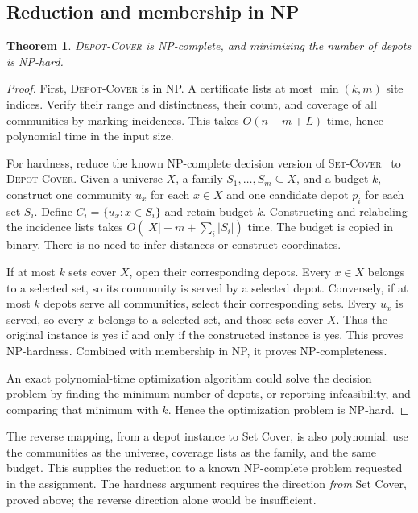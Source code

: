 \documentclass[sigconf,nonacm]{acmart}
\newtheorem{theorem}{Theorem}
\begin{document}
\subsection{Reduction and membership in NP}
\begin{theorem}
\textsc{Depot-Cover} is NP-complete, and minimizing the number of depots is
NP-hard.
\end{theorem}
\begin{proof}
First, \textsc{Depot-Cover} is in NP. A certificate lists at most
$\min(k,m)$ site indices. Verify their range and distinctness, their count,
and coverage of all communities by marking incidences. This takes
$O(n+m+L)$ time, hence polynomial time in the input size.

For hardness, reduce the known NP-complete decision version of
\textsc{Set-Cover}~\cite{karp} to \textsc{Depot-Cover}. Given a universe
$X$, a family $S_1,\ldots,S_m\subseteq X$, and a budget $k$, construct one
community $u_x$ for each $x\in X$ and one candidate depot $p_i$ for each set
$S_i$. Define $C_i=\{u_x:x\in S_i\}$ and retain budget $k$.
Constructing and relabeling the incidence lists takes
$O(|X|+m+\sum_i|S_i|)$ time. The budget is copied in binary. There is no
need to infer distances or construct coordinates.

If at most $k$ sets cover $X$, open their corresponding depots. Every
$x\in X$ belongs to a selected set, so its community is served by a selected
depot. Conversely, if at most $k$ depots serve all communities, select their
corresponding sets. Every $u_x$ is served, so every $x$ belongs to a selected
set, and those sets cover $X$. Thus the original instance is yes if and only
if the constructed instance is yes. This proves NP-hardness. Combined with
membership in NP, it proves NP-completeness.

An exact polynomial-time optimization algorithm could solve the decision
problem by finding the minimum number of depots, or reporting infeasibility,
and comparing that minimum with $k$. Hence the optimization problem is
NP-hard.
\end{proof}

The reverse mapping, from a depot instance to Set Cover, is also polynomial:
use the communities as the universe, coverage lists as the family, and the
same budget. This supplies the reduction to a known NP-complete problem
requested in the assignment. The hardness argument requires the direction
\emph{from} Set Cover, proved above; the reverse direction alone would be
insufficient.
\end{document}
